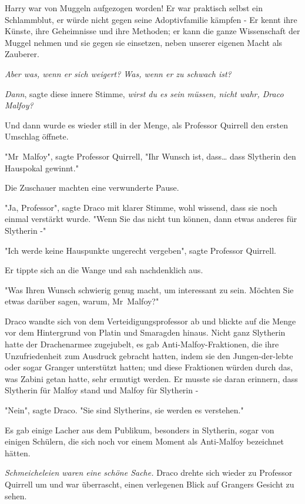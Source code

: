 {Harry war von Muggeln aufgezogen worden! Er war praktisch selbst ein Schlammblut, er würde nicht gegen seine Adoptivfamilie kämpfen - Er kennt ihre Künste, ihre Geheimnisse und ihre Methoden; er kann die ganze Wissenschaft der Muggel nehmen und sie gegen sie einsetzen, neben unserer eigenen Macht als Zauberer.

\emph{Aber was, wenn er sich weigert? Was, wenn er zu schwach ist?}

\emph{Dann}, sagte diese innere Stimme, \emph{wirst du es sein müssen, nicht wahr, Draco Malfoy?}

Und dann wurde es wieder still in der Menge, als Professor Quirrell den ersten Umschlag öffnete.

"Mr~Malfoy", sagte Professor Quirrell, "Ihr Wunsch ist, dass… dass Slytherin den Hauspokal gewinnt."

Die Zuschauer machten eine verwunderte Pause.

"Ja, Professor", sagte Draco mit klarer Stimme, wohl wissend, dass sie noch einmal verstärkt wurde. "Wenn Sie das nicht tun können, dann etwas anderes für Slytherin -"

"Ich werde keine Hauspunkte ungerecht vergeben", sagte Professor Quirrell.

Er tippte sich an die Wange und sah nachdenklich aus.

"Was Ihren Wunsch schwierig genug macht, um interessant zu sein. Möchten Sie etwas darüber sagen, warum, Mr~Malfoy?"

Draco wandte sich von dem Verteidigungsprofessor ab und blickte auf die Menge vor dem Hintergrund von Platin und Smaragden hinaus. Nicht ganz Slytherin hatte der Drachenarmee zugejubelt, es gab Anti-Malfoy-Fraktionen, die ihre Unzufriedenheit zum Ausdruck gebracht hatten, indem sie den Jungen-der-lebte oder sogar Granger unterstützt hatten; und diese Fraktionen würden durch das, was Zabini getan hatte, sehr ermutigt werden. Er musste sie daran erinnern, dass Slytherin für Malfoy stand und Malfoy für Slytherin -

"Nein", sagte Draco. "Sie sind Slytherins, sie werden es verstehen."

Es gab einige Lacher aus dem Publikum, besonders in Slytherin, sogar von einigen Schülern, die sich noch vor einem Moment als Anti-Malfoy bezeichnet hätten.

\emph{Schmeicheleien waren eine schöne Sache.} Draco drehte sich wieder zu Professor Quirrell um und war überrascht, einen verlegenen Blick auf Grangers Gesicht zu sehen.

}
